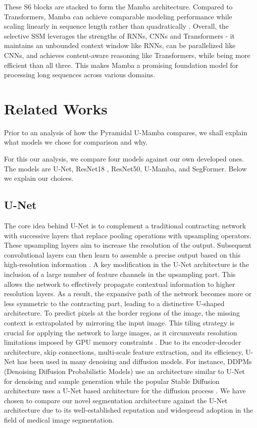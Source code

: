 \documentclass[conference]{IEEEtran}
\begin{document}
These S6 blocks are stacked to form the Mamba architecture. Compared to Transformers, Mamba can achieve comparable modeling performance while scaling linearly in sequence length rather than quadratically \cite{gu2023mamba}. Overall, the selective SSM leverages the strengths of RNNs, CNNs and Transformers - it maintains an unbounded context window like RNNs, can be parallelized like CNNs, and achieves content-aware reasoning like Transformers, while being more efficient than all three. This makes Mamba a promising foundation model for processing long sequences across various domains.


\section{Related Works}
Prior to an analysis of how the Pyramidal U-Mamba compares, we shall explain what models we chose for comparison and why.

For this our analysis, we compare four models against our own developed ones. The models are U-Net\cite{ronneberger2015unet}, ResNet18 \cite{he2015deep}, ResNet50, U-Mamba\cite{ma2024umamba}, and SegFormer\cite{xie2021segformer}. Below we explain our choices.
\subsection{U-Net}
The core idea behind U-Net is to complement a traditional contracting network with successive layers that replace pooling operations with upsampling operators. These upsampling layers aim to increase the resolution of the output. Subsequent convolutional layers can then learn to assemble a precise output based on this high-resolution information \cite{ronneberger2015unet}.
A key modification in the U-Net architecture is the inclusion of a large number of feature channels in the upsampling part. This allows the network to effectively propagate contextual information to higher resolution layers. As a result, the expansive path of the network becomes more or less symmetric to the contracting part, leading to a distinctive U-shaped architecture. To predict pixels at the border regions of the image, the missing context is extrapolated by mirroring the input image. This tiling strategy is crucial for applying the network to large images, as it circumvents resolution limitations imposed by GPU memory constraints \cite{ronneberger2015unet}. Due to its encoder-decoder architecture, skip connections, multi-scale feature extraction, and its efficiency, U-Net has been used in many denoising and diffusion models. For instance, DDPMs (Denoising Diffusion Probabilistic Models) use an architecture similar to U-Net for denoising and sample generation \cite{ho2020denoising} while the popular Stable Diffusion architecture uses a U-Net based architecture for the diffusion process \cite{rombach2022highresolution}. We have chosen to compare our novel segmentation architecture against the U-Net architecture due to its well-established reputation and widespread adoption in the field of medical image segmentation.
\end{document}
